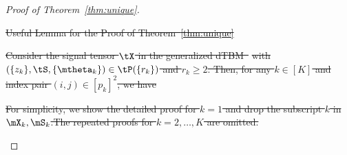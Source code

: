 \documentclass[lettersize,onecolumn,journal]{IEEEtran}
\theoremstyle{definition}
\newtheorem{lem}{Lemma}
\theoremstyle{definition}
\providecommand{\DIFdeltex}[1]{{\protect\color{red}\sout{#1}}}                      %
\providecommand{\DIFdel}[1]{\texorpdfstring{\DIFdeltex{#1}}{}} %
\begin{document}
\begin{proof}[Proof of Theorem~\ref{thm:unique}]
\begin{enumerate}[wide]
\DIFdel{Useful Lemma for the Proof of Theorem~\ref{thm:unique}}%

\DIFdel{Consider the signal tensor $\tX$ in the generalized dTBM~}%
\DIFdel{with $(\{z_k\},\tS,\{\mtheta_k\})\in \tP(\{r_k\})$ and $r_k \geq 2$. Then, for any $k \in [K]$ and index pair $(i,j)\in[p_k]^2$, we have 
}%

\DIFdel{For simplicity, we show the detailed proof for $k = 1$ and drop the subscript $k$ in $\mX_k, \mS_k$.The repeated proofs for $k = 2, \ldots, K$ are omitted. 
}%


\end{enumerate}
\end{proof}
\end{document}

